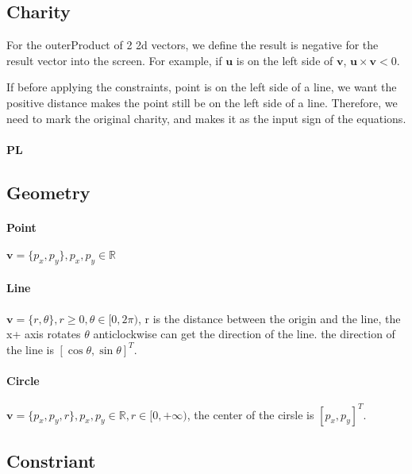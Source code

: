 \documentclass[UTF8]{../09-Mathematics}
\begin{document}
\subsection{Charity}

For the outerProduct of 2 2d vectors, we define the result is negative for the result vector into the screen. For example, if $\boldsymbol u$ is on the left side of  $\boldsymbol v$, $\boldsymbol u \times\boldsymbol v < 0 $.

If before applying the constraints, point is on the left side of a line, we want the positive distance makes the point still be on the left side of a line. Therefore, we need to mark the original charity, and makes it as the input sign of the equations.


\paragraph{PL}




\subsection{Geometry}


\paragraph{Point}

$\boldsymbol v = \{p_x, p_y\}, p_x, p_y \in \mathbb R$


\paragraph{Line}

$\boldsymbol v = \{r, \theta\},r\geqslant 0,  \theta \in [0, 2\pi)$, r is the distance between the origin and the line, the x+ axis rotates  $\theta$ anticlockwise can get the direction of the line. the direction of the line is $[\cos \theta, \sin \theta]^T$.


\paragraph{Circle}

$\boldsymbol v = \{p_x, p_y, r\}, p_x, p_y \in \mathbb R, r\in [0, +\infty)$, the center of the cirsle is $[p_x, p_y]^T$.



\subsection{Constriant}
\end{document}
